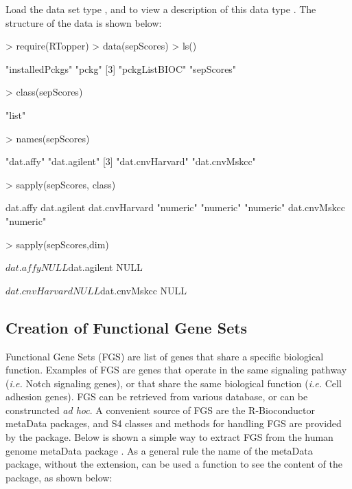 \documentclass[11pt]{article}
\newcommand{\Rcode}[1]{{\texttt{\color{BrickRed}{#1}}}}
\renewenvironment{Schunk}{\vspace{\topsep}}{\vspace{\topsep}}
\begin{document}
Load the data set type \Rcode{data(sepScores)}, and to view a description of this 
data type \Rcode{?sepScores}. The structure of the data is shown below:

\begin{Schunk}
\begin{Sinput}
> require(RTopper)
> data(sepScores)
> ls()
\end{Sinput}
\begin{Soutput}
[1] "installedPckgs" "pckg"          
[3] "pckgListBIOC"   "sepScores"     
\end{Soutput}
\begin{Sinput}
> class(sepScores)
\end{Sinput}
\begin{Soutput}
[1] "list"
\end{Soutput}
\begin{Sinput}
> names(sepScores)
\end{Sinput}
\begin{Soutput}
[1] "dat.affy"       "dat.agilent"   
[3] "dat.cnvHarvard" "dat.cnvMskcc"  
\end{Soutput}
\begin{Sinput}
> sapply(sepScores, class)
\end{Sinput}
\begin{Soutput}
      dat.affy    dat.agilent dat.cnvHarvard 
     "numeric"      "numeric"      "numeric" 
  dat.cnvMskcc 
     "numeric" 
\end{Soutput}
\begin{Sinput}
> sapply(sepScores,dim)
\end{Sinput}
\begin{Soutput}
$dat.affy
NULL

$dat.agilent
NULL

$dat.cnvHarvard
NULL

$dat.cnvMskcc
NULL
\end{Soutput}
\end{Schunk}


\subsection{Creation of Functional Gene Sets}
Functional Gene Sets (FGS) are list of genes that share a specific biological function.
Examples of FGS are genes that operate in the same signaling pathway 
({\it i.e.} Notch signaling genes), or that share the same biological function
({\it i.e.} Cell adhesion genes).
FGS can be retrieved from various database, or can be construncted {\it ad hoc}.
A convenient source of FGS are the R-Bioconductor metaData packages,
and S4 classes and methods for handling FGS are provided by the \Rcode{GSEABase}
package. Below is shown a simple way to extract FGS from the human genome
metaData package \Rcode{org.Hs.eg.db}.
As a general rule the name of the metaData package, without the \Rcode{.db} extension,
can be used a function to see the content of the package, as shown below:
\end{document}
